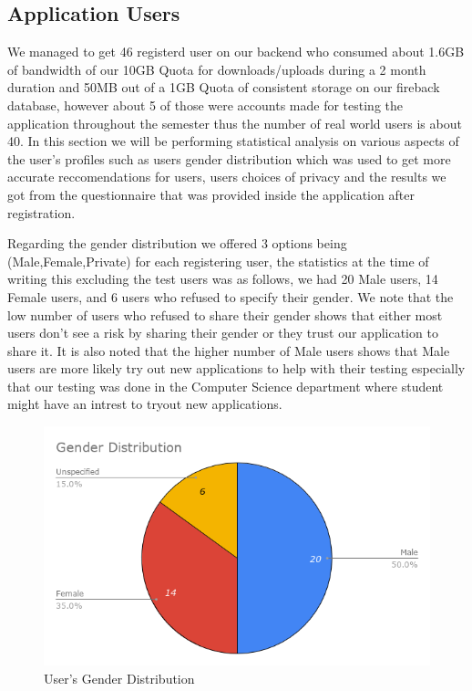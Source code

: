 \subsection{Application Users}
\label{subsec:Application}
We managed to get 46 registerd user on our backend who consumed about 1.6GB of bandwidth of our 10GB Quota for downloads/uploads during a 2 month duration and 50MB out of a 1GB Quota of consistent storage on our fireback database, however about 5 of those were accounts made for testing the application throughout the semester thus the number of real world users is about 40.
In this section we will be performing statistical analysis on various aspects of the user's profiles such as users gender distribution which was used to get more accurate reccomendations for users, users choices of privacy and the results we got from the questionnaire that was provided inside the application after registration.\par

Regarding the gender distribution we offered 3 options being (Male,Female,Private) for each registering user, the statistics at the time of writing this excluding the test users was as follows,
we had 20 Male users, 14 Female users, and 6 users who refused to specify their gender. We note that the low number of users who refused to share their gender shows that either most users don't see a risk by sharing their gender or they trust our application to share it.
It is also noted that the higher number of Male users shows that Male users are more likely try out new applications to help with their testing especially that our testing was done in the Computer Science department where student might have an intrest to tryout new applications.
\begin{figure}[H]
    \centering
    \includegraphics[scale=0.55]{Gender}
    \caption{User's Gender Distribution}
    \label{fig:Gender}
\end{figure}

